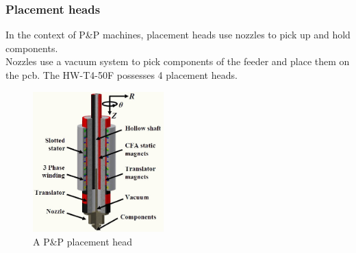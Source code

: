 \documentclass[a4paper,10pt]{report}
\begin{document}
\subsubsection{Placement heads}
In the context of P\&P machines, placement heads use nozzles to pick up and hold components.\\
Nozzles use a vacuum system to pick components of the feeder and place them on the pcb.
The HW-T4-50F possesses 4 placement heads.
\begin{figure}[!htb]
 \centering
 \includegraphics[width=0.45\textwidth]{images/placement_head.jpg}
 \caption{A P\&P placement head}
\end{figure}
\newpage
\end{document}
